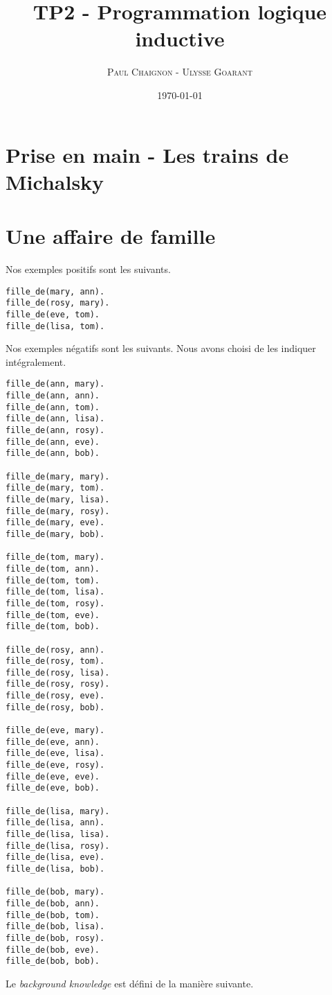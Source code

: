 \documentclass[a4paper,12pt]{article}
\title{TP2 - Programmation logique inductive}
\author{\textsc{Paul Chaignon} - \textsc{Ulysse Goarant}}
\date{\today}
\begin{document}
\lstset{language=Prolog}

\maketitle

\section{Prise en main - Les trains de Michalsky}


\section{Une affaire de famille}
Nos exemples positifs sont les suivants.

\begin{lstlisting}[frame=single]
fille_de(mary, ann).
fille_de(rosy, mary).
fille_de(eve, tom).
fille_de(lisa, tom).
\end{lstlisting}

Nos exemples négatifs sont les suivants. Nous avons choisi de les indiquer intégralement.

\begin{lstlisting}[frame=single]
fille_de(ann, mary).
fille_de(ann, ann).
fille_de(ann, tom).
fille_de(ann, lisa).
fille_de(ann, rosy).
fille_de(ann, eve).
fille_de(ann, bob).

fille_de(mary, mary).
fille_de(mary, tom).
fille_de(mary, lisa).
fille_de(mary, rosy).
fille_de(mary, eve).
fille_de(mary, bob).

fille_de(tom, mary).
fille_de(tom, ann).
fille_de(tom, tom).
fille_de(tom, lisa).
fille_de(tom, rosy).
fille_de(tom, eve).
fille_de(tom, bob).

fille_de(rosy, ann).
fille_de(rosy, tom).
fille_de(rosy, lisa).
fille_de(rosy, rosy).
fille_de(rosy, eve).
fille_de(rosy, bob).

fille_de(eve, mary).
fille_de(eve, ann).
fille_de(eve, lisa).
fille_de(eve, rosy).
fille_de(eve, eve).
fille_de(eve, bob).

fille_de(lisa, mary).
fille_de(lisa, ann).
fille_de(lisa, lisa).
fille_de(lisa, rosy).
fille_de(lisa, eve).
fille_de(lisa, bob).

fille_de(bob, mary).
fille_de(bob, ann).
fille_de(bob, tom).
fille_de(bob, lisa).
fille_de(bob, rosy).
fille_de(bob, eve).
fille_de(bob, bob).
\end{lstlisting}

Le \textit{background knowledge} est défini de la manière suivante.
\end{document}

